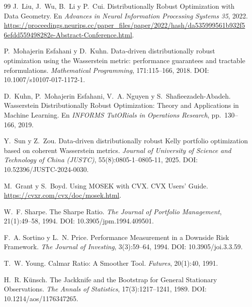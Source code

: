 \documentclass[11pt]{article}
\begin{document}
\begin{thebibliography}{99}
J.~Liu, J.~Wu, B.~Li y P.~Cui.
\newblock Distributionally Robust Optimization with Data Geometry.
\newblock En \emph{Advances in Neural Information Processing Systems 35},
2022.
\newblock \url{https://proceedings.neurips.cc/paper_files/paper/2022/hash/da535999561b932f56efdd559498282e-Abstract-Conference.html}.

 P.~Mohajerin Esfahani y D.~Kuhn.
\newblock Data-driven distributionally robust optimization using the
   Wasserstein metric: performance guarantees and tractable reformulations.
\newblock \emph{Mathematical Programming}, 171:115--166, 2018.
\newblock DOI: 10.1007/s10107-017-1172-1.

 D.~Kuhn, P.~Mohajerin Esfahani, V.~A. Nguyen y S.~Shafieezadeh-Abadeh.
 \newblock Wasserstein Distributionally Robust Optimization: Theory and
  Applications in Machine Learning.
\newblock En \emph{INFORMS TutORials in Operations Research}, pp.~130--166, 2019.


Y.~Sun y Z.~Zou.
\newblock Data-driven distributionally robust Kelly portfolio optimization
  based on coherent Wasserstein metrics.
\newblock \emph{Journal of University of Science and Technology of China
  (JUSTC)}, 55(8):0805-1--0805-11, 2025.
\newblock DOI: 10.52396/JUSTC-2024-0030.

 M.~Grant y S.~Boyd.
 \newblock Using MOSEK with CVX.
 \newblock CVX Users' Guide. \url{https://cvxr.com/cvx/doc/mosek.html}.

W.~F. Sharpe.
\newblock The Sharpe Ratio.
\newblock \emph{The Journal of Portfolio Management}, 21(1):49--58, 1994.
\newblock DOI: 10.3905/jpm.1994.409501.

F.~A. Sortino y L.~N. Price.
\newblock Performance Measurement in a Downside Risk Framework.
\newblock \emph{The Journal of Investing}, 3(3):59--64, 1994.
\newblock DOI: 10.3905/joi.3.3.59.

T.~W. Young.
\newblock Calmar Ratio: A Smoother Tool.
\newblock \emph{Futures}, 20(1):40, 1991.

H.~R. K{\"u}nsch.
\newblock The Jackknife and the Bootstrap for General Stationary Observations.
\newblock \emph{The Annals of Statistics}, 17(3):1217--1241, 1989.
\newblock DOI: 10.1214/aos/1176347265.


\end{thebibliography}
\end{document}
